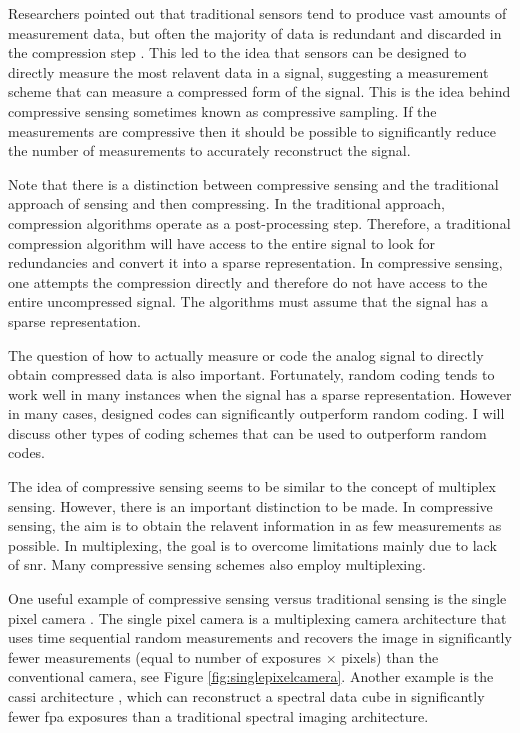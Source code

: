 Researchers pointed out that traditional sensors tend to produce vast amounts of measurement data, but often the majority of data is redundant and discarded in the compression step \cite{candes2006robust, candes2006near, donoho2006compressed}. This led to the idea that sensors can be designed to directly measure the most relavent data in a signal, suggesting a measurement scheme that can measure a compressed form of the signal. This is the idea behind \gls{compressive sensing} sometimes known as \gls{compressive sampling}. If the measurements are compressive then it should be possible to significantly reduce the number of measurements to accurately reconstruct the signal. 

Note that there is a distinction between compressive sensing and the traditional approach of sensing and then compressing. In the traditional approach, compression algorithms operate as a post-processing step. Therefore, a traditional compression algorithm will have access to the entire signal to look for redundancies and convert it into a sparse representation. In compressive sensing, one attempts the compression directly and therefore do not have access to the entire uncompressed signal. The algorithms must assume that the signal has a sparse representation. 

The question of how to actually measure or code the analog signal to directly obtain compressed data is also important. Fortunately, random coding tends to work well in many instances when the signal has a sparse representation. However in many cases, designed codes can significantly outperform random coding. I will discuss other types of coding schemes that can be used to outperform random codes. 

The idea of compressive sensing seems to be similar to the concept of multiplex sensing. However, there is an important distinction to be made. In compressive sensing, the aim is to obtain the relavent information in as few measurements as possible. In multiplexing, the goal is to overcome limitations mainly due to lack of \gls{snr}. Many compressive sensing schemes also employ multiplexing.

One useful example of compressive sensing versus traditional sensing is the single pixel camera \cite{duarte2008single}. The single pixel camera is a multiplexing camera architecture that uses time sequential random measurements and recovers the image in significantly fewer measurements (equal to number of exposures $\times$ pixels) than the conventional camera, see Figure \ref{fig:singlepixelcamera}. Another example is the \gls{cassi} architecture \cite{wagadarikar2008single}, which can reconstruct a spectral data cube in significantly fewer \gls{fpa} exposures than a traditional spectral imaging architecture. 


